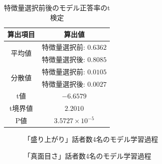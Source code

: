 \begin{table}[t]
    \caption{特徴量選択前後のモデル正答率のt検定}
    \centering
    \begin{tabular}{cc}
        \hline
        算出項目 & 算出値 \\
        \hline\hline
        \multirow{2}{*}{平均値} & 特徴量選択前: $0.6362$ \\
        & 特徴量選択後: $0.8085$ \\ \hline
        \multirow{2}{*}{分散値} & 特徴量選択前: $0.0105$ \\
        & 特徴量選択後: $0.0027$ \\ \hline
        t値 & $-6.6579$ \\ \hline
        t境界値 & $2.2010$ \\ \hline
        P値 & $3.5727 \times 10^{-5}$ \\ \hline
    \end{tabular}
    \label{tab:correct_rate_t-test}
\end{table}

\begin{figure}
    \centering
    \caption{「盛り上がり」話者数4名のモデル学習過程}
    \label{fig:exc4}
\end{figure}

\begin{figure}
    \centering
    \caption{「真面目さ」話者数4名のモデル学習過程}
    \label{fig:ser4}
\end{figure}

